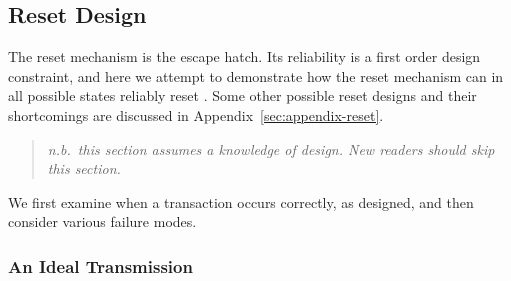 \subsection{Reset Design}
\label{sec:design-reset}
The reset mechanism is the \bus escape hatch. Its reliability is a first
order design constraint, and here we attempt to demonstrate how the reset
mechanism can in all possible states reliably reset \bus. Some other possible
reset designs and their shortcomings are discussed in
Appendix~\ref{sec:appendix-reset}.
\begin{quote}
\em n.b.\ this section assumes a knowledge of \bus design. New readers should
skip this section.
\end{quote}

We first examine when a transaction occurs correctly, as designed, and then
consider various failure modes.

\subsubsection{An Ideal Transmission}
~

